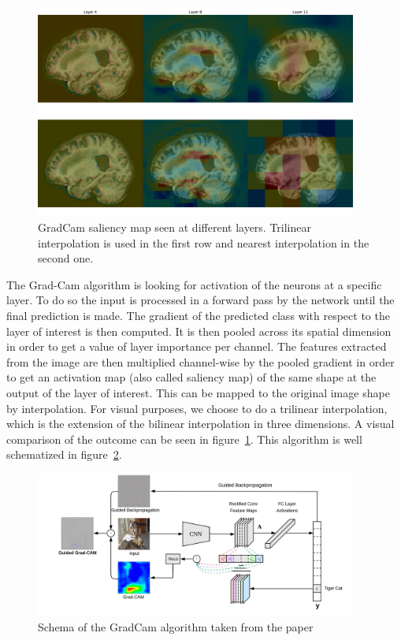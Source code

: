 \begin{figure}
    \centering
    \includegraphics[width=400]{figures/gradcam_multilayer.pdf}
    \caption{GradCam saliency map seen at different layers. Trilinear interpolation is used in the first row and nearest interpolation in the second one.}
    \label{fig:grad_cam_multilayer}
\end{figure}

The Grad-Cam\cite{grad_cam_2019} algorithm is looking for activation of the neurons at a specific layer. To do so the input is processed in a forward pass by the network until the final prediction is made. The gradient of the predicted class with respect to the layer of interest is then computed. It is then pooled across its spatial dimension in order to get a value of layer importance per channel. The features extracted from the image are then multiplied channel-wise by the pooled gradient in order to get an activation map (also called saliency map) of the same shape at the output of the layer of interest. This can be mapped to the original image shape by interpolation. For visual purposes, we choose to do a trilinear interpolation, which is the extension of the bilinear interpolation in three dimensions. A visual comparison of the outcome can be seen in figure~\ref{fig:grad_cam_multilayer}. This algorithm is well schematized in figure~\ref{fig:grad_cam_arch}.

\begin{figure}
    \centering
    \includegraphics[width=400]{figures/grad_cam_arch.jpeg}
    \caption{Schema of the GradCam algorithm taken from the paper\cite{grad_cam_2019}}
    \label{fig:grad_cam_arch}
\end{figure}

